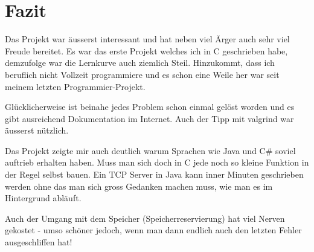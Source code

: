 \chapter{Fazit}
Das Projekt war äusserst interessant und hat neben viel Ärger auch sehr viel Freude bereitet. Es war das erste Projekt welches ich in C geschrieben habe, demzufolge war die Lernkurve auch ziemlich Steil. Hinzukommt, dass ich beruflich nicht Vollzeit programmiere und es schon eine Weile her war seit meinem letzten Programmier-Projekt.

Glücklicherweise ist beinahe jedes Problem schon einmal gelöst worden und es gibt ausreichend Dokumentation im Internet. Auch der Tipp mit valgrind war äusserst nützlich. 

Das Projekt zeigte mir auch deutlich warum Sprachen wie Java und C\# soviel auftrieb erhalten haben. Muss man sich doch in C jede noch so kleine Funktion in der Regel selbst bauen. Ein TCP Server in Java kann inner Minuten geschrieben werden ohne das man sich gross Gedanken machen muss, wie man es im Hintergrund abläuft.

Auch der Umgang mit dem Speicher (Speicherreservierung) hat viel Nerven gekostet - umso schöner jedoch, wenn man dann endlich auch den letzten Fehler ausgeschliffen hat!